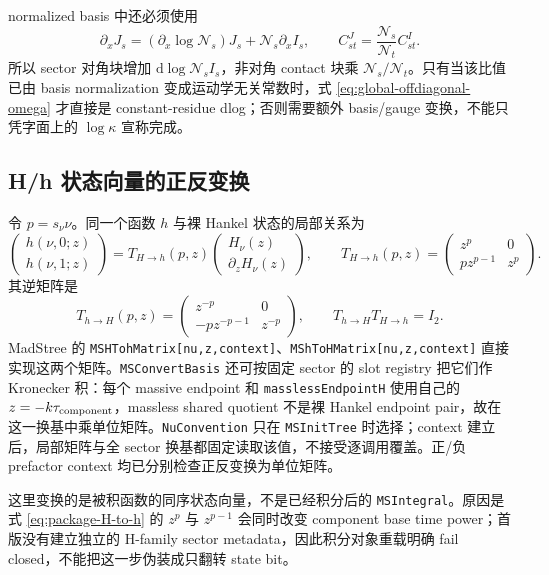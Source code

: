 \documentclass[11pt,a4paper]{ctexart}
\newcommand{\dd}{\mathrm d}
\newcommand{\cN}{\mathcal N}
\begin{document}
normalized basis 中还必须使用
\begin{equation}
 \partial_xJ_s
 =(\partial_x\log\cN_s)J_s+\cN_s\partial_xI_s,
 \qquad
 C^{J}_{st}=\frac{\cN_s}{\cN_t}C^{I}_{st}.
 \label{eq:normalization-adapter}
\end{equation}
所以 sector 对角块增加 $\dd\log\cN_sI_s$，非对角 contact 块乘 $\cN_s/\cN_t$。只有当该比值已由 basis normalization 变成运动学无关常数时，式 \eqref{eq:global-offdiagonal-omega} 才直接是 constant-residue dlog；否则需要额外 basis/gauge 变换，不能只凭字面上的 $\log\kappa$ 宣称完成。

\subsection{H/h 状态向量的正反变换}

令 $p=s_\nu\nu$。同一个函数 $h$ 与裸 Hankel 状态的局部关系为
\begin{equation}
 \begin{pmatrix}h(\nu,0;z)\\h(\nu,1;z)\end{pmatrix}
 =T_{H\to h}(p,z)
 \begin{pmatrix}H_\nu(z)\\\partial_zH_\nu(z)\end{pmatrix},
 \qquad
 T_{H\to h}(p,z)=
 \begin{pmatrix}
  z^p&0\\p z^{p-1}&z^p
 \end{pmatrix}.
 \label{eq:package-H-to-h}
\end{equation}
其逆矩阵是
\begin{equation}
 T_{h\to H}(p,z)=
 \begin{pmatrix}
  z^{-p}&0\\-p z^{-p-1}&z^{-p}
 \end{pmatrix},
 \qquad
 T_{h\to H}T_{H\to h}=I_2.
 \label{eq:package-h-to-H}
\end{equation}
MadStree 的 \texttt{MSHTohMatrix[nu,z,context]}、\texttt{MShToHMatrix[nu,z,context]} 直接实现这两个矩阵。\texttt{MSConvertBasis} 还可按固定 sector 的 slot registry 把它们作 Kronecker 积：每个 massive endpoint 和 \texttt{masslessEndpointH} 使用自己的 $z=-k\tau_{\rm component}$，massless shared quotient 不是裸 Hankel endpoint pair，故在这一换基中乘单位矩阵。\texttt{NuConvention} 只在 \texttt{MSInitTree} 时选择；context 建立后，局部矩阵与全 sector 换基都固定读取该值，不接受逐调用覆盖。正/负 prefactor context 均已分别检查正反变换为单位矩阵。

这里变换的是被积函数的同序状态向量，不是已经积分后的 \texttt{MSIntegral}。原因是式 \eqref{eq:package-H-to-h} 的 $z^p$ 与 $z^{p-1}$ 会同时改变 component base time power；首版没有建立独立的 H-family sector metadata，因此积分对象重载明确 fail closed，不能把这一步伪装成只翻转 state bit。
\end{document}
